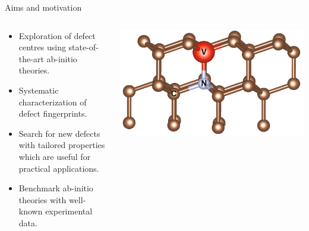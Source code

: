 \begin{frame}{Aims and motivation} %

  \begin{columns}
    \begin{column}{0.5\textwidth}
      \begin{itemize}

        \item
          Exploration of defect centres using state-of-the-art ab-initio
          theories.

        \item
          Systematic characterization of defect fingerprints.

        \item
          Search for new defects with tailored properties which are useful
          for practical applications.

        \item
          Benchmark ab-initio theories with well-known
          experimental data.


      \end{itemize}
    \end{column}
    \begin{column}{0.5\textwidth}
      \begin{center}
        \includegraphics[width=1\textwidth]{images/POSCAR_16_view.png}
      \end{center}
    \end{column}
  \end{columns}


\end{frame}

